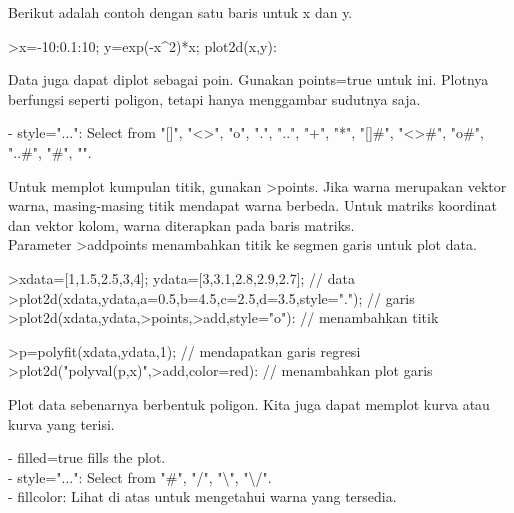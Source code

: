 \documentclass{article}
\begin{document}
\begin{eulernotebook}
\begin{eulercomment}
\begin{eulercomment}
\begin{eulercomment}
\begin{eulercomment}
\begin{eulercomment}
Berikut adalah contoh dengan satu baris untuk x dan y.
\end{eulercomment}
\begin{eulerprompt}
>x=-10:0.1:10; y=exp(-x^2)*x; plot2d(x,y):
\end{eulerprompt}
\begin{eulercomment}
Data juga dapat diplot sebagai poin. Gunakan points=true untuk ini.
Plotnya berfungsi seperti poligon, tetapi hanya menggambar sudutnya
saja.

- style="...": Select from "[]", "\textless{}\textgreater{}", "o", ".", "..", "+", "*",
"[]#", "\textless{}\textgreater{}#", "o#", "..#", "#", "\textbar{}".

Untuk memplot kumpulan titik, gunakan \textgreater{}points. Jika warna merupakan
vektor warna, masing-masing titik mendapat warna berbeda. Untuk
matriks koordinat dan vektor kolom, warna diterapkan pada baris
matriks.\\
Parameter \textgreater{}addpoints menambahkan titik ke segmen garis untuk plot
data.
\end{eulercomment}
\begin{eulerprompt}
>xdata=[1,1.5,2.5,3,4]; ydata=[3,3.1,2.8,2.9,2.7]; // data
>plot2d(xdata,ydata,a=0.5,b=4.5,c=2.5,d=3.5,style="."); // garis
>plot2d(xdata,ydata,>points,>add,style="o"): // menambahkan titik
\end{eulerprompt}
\begin{eulerprompt}
>p=polyfit(xdata,ydata,1); // mendapatkan garis regresi
>plot2d("polyval(p,x)",>add,color=red): // menambahkan plot garis
\end{eulerprompt}
\begin{eulercomment}
Plot data sebenarnya berbentuk poligon. Kita juga dapat memplot kurva
atau kurva yang terisi.

- filled=true fills the plot.\\
- style="...": Select from "#", "/", "\textbackslash{}", "\textbackslash{}/".\\
- fillcolor: Lihat di atas untuk mengetahui warna yang tersedia.


\end{eulercomment}
\end{eulercomment}
\end{eulercomment}
\end{eulercomment}
\end{eulercomment}
\end{eulernotebook}
\end{document}

